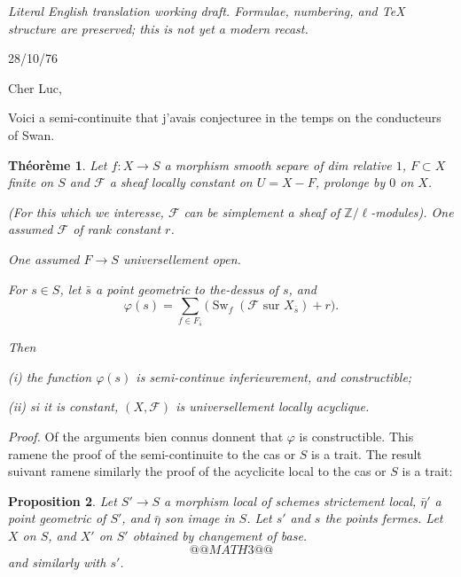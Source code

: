 \documentclass[11pt,a4paper]{article}
\theoremstyle{plain}
\newtheorem{theorem}{Th\'eor\`eme}
\newtheorem{proposition}[theorem]{Proposition}
\theoremstyle{definition}
\DeclareMathOperator{\Sw}{Sw}
\begin{document}
\begin{center}\small\emph{Literal English translation working draft. Formulae, numbering, and TeX structure are preserved; this is not yet a modern recast.}\end{center}
\vspace{0.5em}



\begin{flushright}
28/10/76
\end{flushright}

\noindent Cher Luc,

\medskip

Voici a semi-continuite that j'avais conjecturee in the temps on the conducteurs of Swan.

\begin{theorem}
Let $f: X \to S$ a morphism smooth separe of dim relative $1$, $F \subset X$ finite on $S$ and $\mathcal{F}$ a sheaf locally constant on $U = X - F$, prolonge by $0$ on $X$.

\medskip
(For this which we interesse, $\mathcal{F}$ can be simplement a sheaf of $\mathbb{Z}/\ell$-modules). One assumed $\mathcal{F}$ of rank constant $r$.

\medskip
One assumed $F \to S$ universellement open.

\medskip
For $s \in S$, let $\bar{s}$ a point geometric to the-dessus of $s$, and
\[
\varphi(s) = \sum_{f \in F_{\bar{s}}} \bigl(\Sw_f(\mathcal{F} \text{ sur } X_{\bar{s}}) + r\bigr).
\]

\medskip
Then

\textup{(i)} the function $\varphi(s)$ is semi-continue inferieurement, and constructible;

\textup{(ii)} si it is constant, $(X, \mathcal{F})$ is universellement locally acyclique.
\end{theorem}

\medskip

\noindent \textit{Proof.} Of the arguments bien connus donnent that $\varphi$ is constructible. This ramene the proof of the semi-continuite to the cas or $S$ is a trait. The result suivant ramene similarly the proof of the acyclicite local to the cas or $S$ is a trait:

\begin{proposition}
Let $S' \to S$ a morphism local of schemes strictement local, $\bar{\eta}'$ a point geometric of $S'$, and $\bar{\eta}$ son image in $S$. Let $s'$ and $s$ the points fermes. Let $X$ on $S$, and $X'$ on $S'$ obtained by changement of base.
\[
@@MATH3@@
\]
and similarly with $s'$.
\end{proposition}
\end{document}
